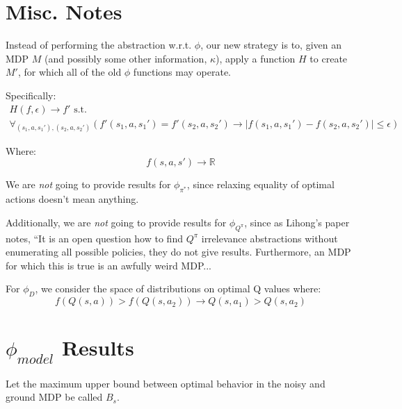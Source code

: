 \documentclass[11pt]{amsart}
\begin{document}
\newpage
\section{Misc. Notes}
 Instead of performing the abstraction w.r.t. $\phi$, our new strategy is to, given an MDP $M$ (and possibly some other information, $\kappa$), apply a function $H$ to create $M'$, for which all of the old $\phi$ functions may operate.

Specifically:
\begin{multline}
H(f, \epsilon) \rightarrow f' \text{  s.t.  } \\ \forall_{(s_1,a,s_1'),(s_2,a,s_2')} \left(f'(s_1,a,s_1') = f'(s_2,a,s_2') \rightarrow | f(s_1,a,s_1') - f(s_2,a,s_2') | \leq \epsilon\right)
\end{multline}

Where:
\begin{equation}
f(s,a,s') \rightarrow \mathbb{R}
\end{equation}


 We are {\it not} going to provide results for $\phi_{\pi^*}$, since relaxing equality of optimal actions doesn't mean anything.

 Additionally, we are {\it not} going to provide results for $\phi_{Q^\pi}$, since as Lihong's paper notes, ``It is an open question how to find $Q^\pi$ irrelevance abstractions without enumerating all possible policies, they do not give results. Furthermore, an MDP for which this is true is an awfully weird MDP...

 For $\phi_D$, we consider the space of distributions on optimal Q values where:
\begin{equation}
f(Q(s,a)) > f(Q(s,a_2)) \rightarrow Q(s,a_1) > Q(s,a_2)
\end{equation}

\newpage
\section{$\phi_{model}$ Results}

Let the maximum upper bound between optimal behavior in the noisy and ground MDP be called $B_s$.
\end{document}
